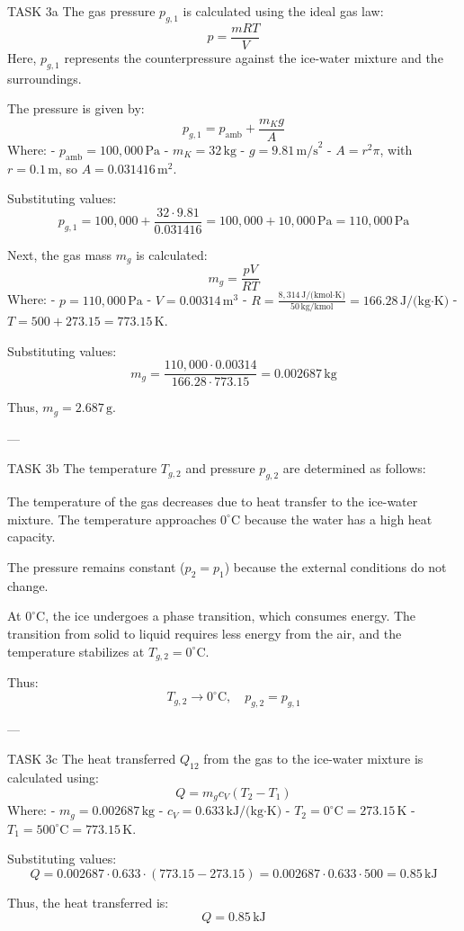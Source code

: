 TASK 3a  
The gas pressure \( p_{g,1} \) is calculated using the ideal gas law:  
\[
p = \frac{mRT}{V}
\]  
Here, \( p_{g,1} \) represents the counterpressure against the ice-water mixture and the surroundings.  

The pressure is given by:  
\[
p_{g,1} = p_{\text{amb}} + \frac{m_K g}{A}
\]  
Where:  
- \( p_{\text{amb}} = 100,000 \, \text{Pa} \)  
- \( m_K = 32 \, \text{kg} \)  
- \( g = 9.81 \, \text{m/s}^2 \)  
- \( A = r^2 \pi \), with \( r = 0.1 \, \text{m} \), so \( A = 0.031416 \, \text{m}^2 \).  

Substituting values:  
\[
p_{g,1} = 100,000 + \frac{32 \cdot 9.81}{0.031416} = 100,000 + 10,000 \, \text{Pa} = 110,000 \, \text{Pa}
\]  

Next, the gas mass \( m_g \) is calculated:  
\[
m_g = \frac{p V}{R T}
\]  
Where:  
- \( p = 110,000 \, \text{Pa} \)  
- \( V = 0.00314 \, \text{m}^3 \)  
- \( R = \frac{8,314 \, \text{J/(kmol·K)}}{50 \, \text{kg/kmol}} = 166.28 \, \text{J/(kg·K)} \)  
- \( T = 500 + 273.15 = 773.15 \, \text{K} \).  

Substituting values:  
\[
m_g = \frac{110,000 \cdot 0.00314}{166.28 \cdot 773.15} = 0.002687 \, \text{kg}
\]  

Thus, \( m_g = 2.687 \, \text{g} \).  

---

TASK 3b  
The temperature \( T_{g,2} \) and pressure \( p_{g,2} \) are determined as follows:  

The temperature of the gas decreases due to heat transfer to the ice-water mixture. The temperature approaches \( 0^\circ\text{C} \) because the water has a high heat capacity.  

The pressure remains constant (\( p_2 = p_1 \)) because the external conditions do not change.  

At \( 0^\circ\text{C} \), the ice undergoes a phase transition, which consumes energy. The transition from solid to liquid requires less energy from the air, and the temperature stabilizes at \( T_{g,2} = 0^\circ\text{C} \).  

Thus:  
\[
T_{g,2} \to 0^\circ\text{C}, \quad p_{g,2} = p_{g,1}
\]  

---

TASK 3c  
The heat transferred \( Q_{12} \) from the gas to the ice-water mixture is calculated using:  
\[
Q = m_g c_V (T_2 - T_1)
\]  
Where:  
- \( m_g = 0.002687 \, \text{kg} \)  
- \( c_V = 0.633 \, \text{kJ/(kg·K)} \)  
- \( T_2 = 0^\circ\text{C} = 273.15 \, \text{K} \)  
- \( T_1 = 500^\circ\text{C} = 773.15 \, \text{K} \).  

Substituting values:  
\[
Q = 0.002687 \cdot 0.633 \cdot (773.15 - 273.15) = 0.002687 \cdot 0.633 \cdot 500 = 0.85 \, \text{kJ}
\]  

Thus, the heat transferred is:  
\[
Q = 0.85 \, \text{kJ}
\]  